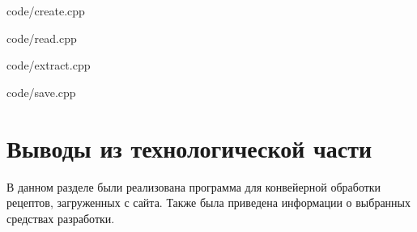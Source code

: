  {code/create.cpp}

 {code/read.cpp}

 {code/extract.cpp}

 {code/save.cpp}

\section*{Выводы из технологической части}
В данном разделе были реализована программа для конвейерной обработки рецептов, загруженных с сайта.
Также была приведена информации о выбранных средствах разработки.